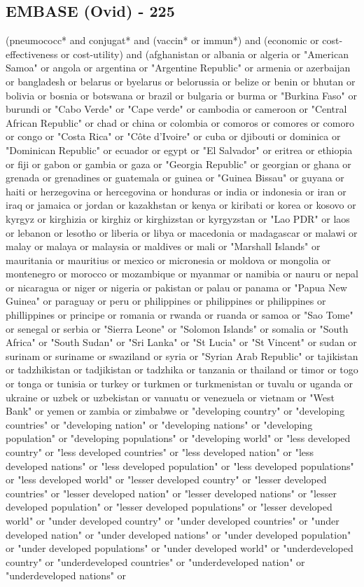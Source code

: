 \documentclass[12pt]{article}
\begin{document}
\subsection{EMBASE (Ovid) - 225}
(pneumococc* and conjugat* and (vaccin* or immun*) and (economic or cost-effectiveness or cost-utility) and (afghanistan or albania or algeria or "American Samoa" or angola or argentina or "Argentine Republic" or armenia or azerbaijan or bangladesh or belarus or byelarus or belorussia or belize or benin or bhutan or bolivia or bosnia or botswana or brazil or bulgaria or burma or "Burkina Faso" or burundi or "Cabo Verde" or "Cape verde" or cambodia or cameroon or "Central African Republic" or chad or china or colombia or comoros or comores or comoro or congo or "Costa Rica" or "Côte d'Ivoire" or cuba or djibouti or dominica or "Dominican Republic" or ecuador or egypt or "El Salvador" or eritrea or ethiopia or fiji or gabon or gambia or gaza or "Georgia Republic" or georgian or ghana or grenada or grenadines or guatemala or guinea or "Guinea Bissau" or guyana or haiti or herzegovina or hercegovina or honduras or india or indonesia or iran or iraq or jamaica or jordan or kazakhstan or kenya or kiribati or korea or kosovo or kyrgyz or kirghizia or kirghiz or kirghizstan or kyrgyzstan or "Lao PDR" or laos or lebanon or lesotho or liberia or libya or macedonia or madagascar or malawi or malay or malaya or malaysia or maldives or mali or "Marshall Islands" or mauritania or mauritius or mexico or micronesia or moldova or mongolia or montenegro or morocco or mozambique or myanmar or namibia or nauru or nepal or nicaragua or niger or nigeria or pakistan or palau or panama or "Papua New Guinea" or paraguay or peru or philippines or philippines or philippines or phillippines or principe or romania or rwanda or ruanda or samoa or "Sao Tome" or senegal or serbia or "Sierra Leone" or "Solomon Islands" or somalia or "South Africa" or "South Sudan" or "Sri Lanka" or "St Lucia" or "St Vincent" or sudan or surinam or suriname or swaziland or syria or "Syrian Arab Republic" or tajikistan or tadzhikistan or tadjikistan or tadzhika or tanzania or thailand or timor or togo or tonga or tunisia or turkey or turkmen or turkmenistan or tuvalu or uganda or ukraine or uzbek or uzbekistan or vanuatu or venezuela or vietnam or "West Bank" or yemen or zambia or zimbabwe or "developing country" or "developing countries" or "developing nation" or "developing nations" or "developing population" or "developing populations" or "developing world" or "less developed country" or "less developed countries" or "less developed nation" or "less developed nations" or "less developed population" or "less developed populations" or "less developed world" or "lesser developed country" or "lesser developed countries" or "lesser developed nation" or "lesser developed nations" or "lesser developed population" or "lesser developed populations" or "lesser developed world" or "under developed country" or "under developed countries" or "under developed nation" or "under developed nations" or "under developed population" or "under developed populations" or "under developed world" or "underdeveloped country" or "underdeveloped countries" or "underdeveloped nation" or "underdeveloped nations" or 
\end{document}

